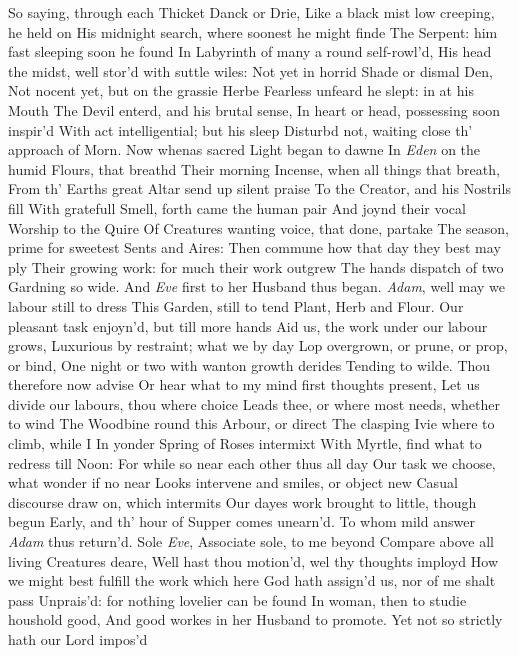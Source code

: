 \documentclass[11pt]{book}
\newcounter {first}
\begin{document}
\quad So saying, through each Thicket Danck or Drie, 
Like a black mist low creeping, he held on 
His midnight search, where soonest he might finde 
The Serpent: him fast sleeping soon he found 
In Labyrinth of many a round self-rowl'd, 
His head the midst, well stor'd with suttle wiles: 
Not yet in horrid Shade or dismal Den, 
Not nocent yet, but on the grassie Herbe 
Fearless unfeard he slept: in at his Mouth 
The Devil enterd, and his brutal sense, 
In heart or head, possessing soon inspir'd 
With act intelligential; but his sleep 
Disturbd not, waiting close th' approach of Morn. 
Now whenas sacred Light began to dawne 
In \textit{Eden} on the humid Flours, that breathd 
Their morning Incense, when all things that breath, 
From th' Earths great Altar send up silent praise 
To the Creator, and his Nostrils fill 
With gratefull Smell, forth came the human pair 
And joynd their vocal Worship to the Quire 
Of Creatures wanting voice, that done, partake 
The season, prime for sweetest Sents and Aires: 
Then commune how that day they best may ply 
Their growing work: for much their work outgrew 
The hands dispatch of two Gardning so wide. 
And \textit{Eve} first to her Husband thus began. 
\quad \textit{Adam}, well may we labour still to dress 
This Garden, still to tend Plant, Herb and Flour. 
Our pleasant task enjoyn'd, but till more hands 
Aid us, the work under our labour grows, 
Luxurious by restraint; what we by day 
Lop overgrown, or prune, or prop, or bind, 
One night or two with wanton growth derides 
Tending to wilde.  Thou therefore now advise 
Or hear what to my mind first thoughts present, 
Let us divide our labours, thou where choice 
Leads thee, or where most needs, whether to wind 
The Woodbine round this Arbour, or direct 
The clasping Ivie where to climb, while I 
In yonder Spring of Roses intermixt 
With Myrtle, find what to redress till Noon: 
For while so near each other thus all day 
Our task we choose, what wonder if no near 
Looks intervene and smiles, or object new 
Casual discourse draw on, which intermits 
Our dayes work brought to little, though begun 
Early, and th' hour of Supper comes unearn'd. 
\quad To whom mild answer \textit{Adam} thus return'd. 
Sole \textit{Eve}, Associate sole, to me beyond 
Compare above all living Creatures deare, 
Well hast thou motion'd, wel thy thoughts imployd 
How we might best fulfill the work which here 
God hath assign'd us, nor of me shalt pass 
Unprais'd: for nothing lovelier can be found 
In woman, then to studie houshold good, 
And good workes in her Husband to promote. 
Yet not so strictly hath our Lord impos'd 
\end{document}
